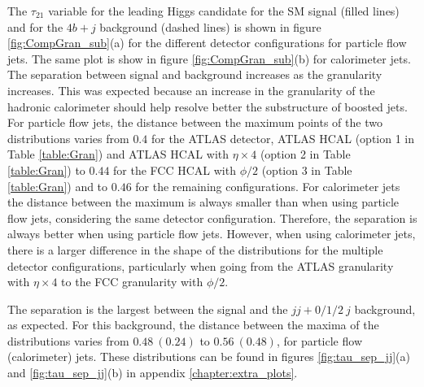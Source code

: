 The $\tau_{21}$ variable for the leading Higgs candidate for the SM signal (filled lines) and for the $4b+j$ background (dashed lines) is shown in figure \ref{fig:CompGran_sub}(a) for the different detector configurations for particle flow jets. The same plot is show in figure \ref{fig:CompGran_sub}(b) for calorimeter jets. The separation between signal and background increases as the granularity increases. This was expected because an increase in the granularity of the hadronic calorimeter should help resolve better the substructure of boosted jets. For particle flow jets, the distance between the maximum points of the two distributions varies from $0.4$ for the ATLAS detector, ATLAS HCAL (option 1 in Table \ref{table:Gran}) and ATLAS HCAL with $\eta\times 4$ (option 2 in Table \ref{table:Gran}) to $0.44$ for the FCC HCAL with $\phi/2$ (option 3 in Table \ref{table:Gran}) and to $0.46$ for the remaining configurations. For calorimeter jets the distance between the maximum is always smaller than when using particle flow jets, considering the same detector configuration. Therefore, the separation is always better when using particle flow jets. However, when using calorimeter jets, there is a larger difference in the shape of the distributions for the multiple detector configurations, particularly when going from the ATLAS granularity with $\eta\times 4$ to the FCC granularity with $\phi/2$. 

The separation is the largest between the signal and the $jj+0/1/2~j$ background, as expected. For this background, the distance between the maxima of the distributions varies from $0.48~(0.24)$ to $0.56 ~(0.48)$, for particle flow (calorimeter) jets. These distributions can be found in figures \ref{fig:tau_sep_jj}(a) and \ref{fig:tau_sep_jj}(b) in appendix \ref{chapter:extra_plots}.


